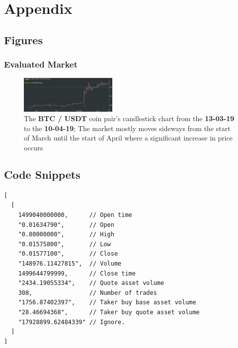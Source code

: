 %
\chapter{Appendix}
\label{sec:appendix}


\section{Figures}
\label{sec:appendix:lrf_imgs}

\subsection{Evaluated Market}
\label{sec:appendix:lrf_imgs:market_evald}
\begin{figure}[ht]
    \centering
	\includegraphics[angle=90,width=0.42\textwidth]{content/graphics/market_evaluated.PNG}
	\caption{The \textbf{BTC / USDT }coin pair's candlestick chart from the \textbf{13-03-19} to the \textbf{10-04-19}; The market mostly moves sideways from the start of March until the start of April where a significant increase in price occurs}
	\label{fig:eval:strats:market_evald}
\end{figure}



\section{Code Snippets}
\label{sec:appendix:code_snippets}


\begin{code}
\label{code:impl:info_comm:bin_exch:api_format}
\begin{verbatim}
[
  [
    1499040000000,      // Open time
    "0.01634790",       // Open
    "0.80000000",       // High
    "0.01575800",       // Low
    "0.01577100",       // Close
    "148976.11427815",  // Volume
    1499644799999,      // Close time
    "2434.19055334",    // Quote asset volume
    308,                // Number of trades
    "1756.87402397",    // Taker buy base asset volume
    "28.46694368",      // Taker buy quote asset volume
    "17928899.62484339" // Ignore.
  ]
]
\end{verbatim}
\end{code}


